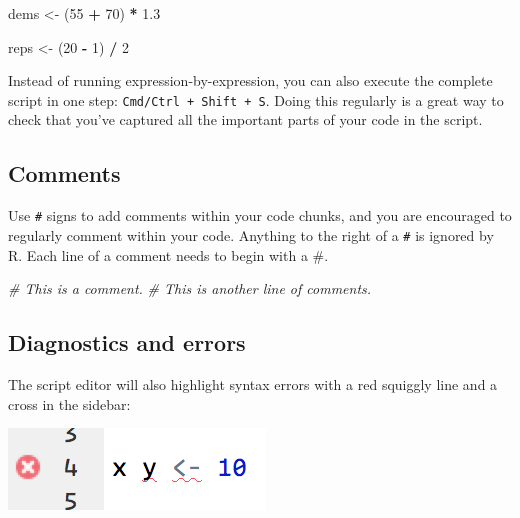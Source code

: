 \documentclass[]{book}
\newenvironment{Shaded}{\begin{snugshade}}{\end{snugshade}}
\newcommand{\DecValTok}[1]{\textcolor[rgb]{0.00,0.00,0.81}{#1}}
\newcommand{\FloatTok}[1]{\textcolor[rgb]{0.00,0.00,0.81}{#1}}
\newcommand{\StringTok}[1]{\textcolor[rgb]{0.31,0.60,0.02}{#1}}
\newcommand{\CommentTok}[1]{\textcolor[rgb]{0.56,0.35,0.01}{\textit{#1}}}
\newcommand{\OperatorTok}[1]{\textcolor[rgb]{0.81,0.36,0.00}{\textbf{#1}}}
\newcommand{\NormalTok}[1]{#1}
\begin{document}
\begin{Shaded}
\begin{Highlighting}[]
\NormalTok{dems <-}\StringTok{ }\NormalTok{(}\DecValTok{55} \OperatorTok{+}\StringTok{ }\DecValTok{70}\NormalTok{) }\OperatorTok{*}\StringTok{ }\FloatTok{1.3}

\NormalTok{reps <-}\StringTok{ }\NormalTok{(}\DecValTok{20} \OperatorTok{-}\StringTok{ }\DecValTok{1}\NormalTok{) }\OperatorTok{/}\StringTok{ }\DecValTok{2}
\end{Highlighting}
\end{Shaded}

Instead of running expression-by-expression, you can also execute the
complete script in one step: \texttt{Cmd/Ctrl\ +\ Shift\ +\ S}. Doing
this regularly is a great way to check that you've captured all the
important parts of your code in the script.

\subsection{Comments}\label{comments}

Use \texttt{\#} signs to add comments within your code chunks, and you
are encouraged to regularly comment within your code. Anything to the
right of a \texttt{\#} is ignored by R. Each line of a comment needs to
begin with a \#.

\begin{Shaded}
\begin{Highlighting}[]
\CommentTok{# This is a comment.}
\CommentTok{# This is another line of comments.}
\end{Highlighting}
\end{Shaded}

\subsection{Diagnostics and errors}\label{diagnostics-and-errors}

The script editor will also highlight syntax errors with a red squiggly
line and a cross in the sidebar:

\begin{center}\includegraphics[width=0.7\linewidth]{img/rstudio-diagnostic} \end{center}
\end{document}

